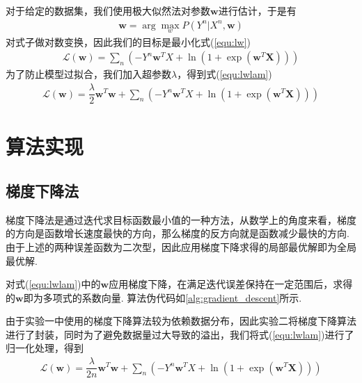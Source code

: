 \documentclass{hitreport}
\begin{document}
对于给定的数据集，我们使用极大似然法对参数$\boldsymbol{w}$进行估计，于是有
\begin{align}
\boldsymbol{w} = \arg \underset{w}{\max}P\left(Y^n|X^n,\boldsymbol{w} \right)
\end{align}
对式子做对数变换，因此我们的目标是最小化式(\ref{equ:lw})
\begin{align}\label{equ:lw}
\mathcal{L}\left(\boldsymbol{w}\right) = \sum_{n}\left(-Y^n\boldsymbol{w}^TX+\ln\left(1+\exp\left(\boldsymbol{w}^T\boldsymbol{X}\right)\right)\right)
\end{align}
为了防止模型过拟合，我们加入超参数$\lambda$，得到式(\ref{equ:lwlam})
\begin{align}\label{equ:lwlam}
\mathcal{L}\left(\boldsymbol{w}\right) =\dfrac{\lambda}{2}\boldsymbol{w}^T\boldsymbol{w}+\sum_{n}\left(-Y^n\boldsymbol{w}^TX+\ln\left(1+\exp\left(\boldsymbol{w}^T\boldsymbol{X}\right)\right)\right)
\end{align}


\section{算法实现}
\subsection{梯度下降法}\label{sec:grad}
梯度下降法是通过迭代求目标函数最小值的一种方法，从数学上的角度来看，梯度的方向是函数增长速度最快的方向，那么梯度的反方向就是函数减少最快的方向.由于上述的两种误差函数为二次型，因此应用梯度下降求得的局部最优解即为全局最优解.

对式(\ref{equ:lwlam})中的$\boldsymbol{w}$应用梯度下降，在满足迭代误差保持在一定范围后，求得的$\boldsymbol{w}$即为多项式的系数向量. 算法伪代码如\ref{alg:gradient_descent}所示. 

由于实验一中使用的梯度下降算法较为依赖数据分布，因此实验二将梯度下降算法进行了封装，同时为了避免数据量过大导致的溢出，我们将式(\ref{equ:lwlam})进行了归一化处理，得到
\begin{align}
\mathcal{L}\left(\boldsymbol{w}\right) =\dfrac{\lambda}{2n}\boldsymbol{w}^T\boldsymbol{w}+\sum_{n}\left(-Y^n\boldsymbol{w}^TX+\ln\left(1+\exp\left(\boldsymbol{w}^T\boldsymbol{X}\right)\right)\right)
\end{align}
\end{document}
